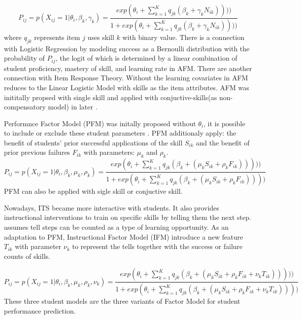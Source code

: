 \documentclass[12pt]{article}
\begin{document}
$$
  P_{ij}= p(X_{ij}=1|\theta_i,\beta_k,\gamma_k)=  \frac{exp(\theta_i+ \sum_{k=1}^{K} q_{jk} (\beta_k+\gamma_k N_{ik}))) )}{1+exp(\theta_i+ \sum_{k=1}^{K} q_{jk} (\beta_k+\gamma_k N_{ik}))) )}
$$ 
 where $q_{jk}$ represents  item $j$ uses skill $k$ with binary value.
 There is a connection with Logistic Regression by modeling success as a Bernoulli distribution with the probability of $P_{ij}$, the logit of which is determined by a linear combination of student proficiency, mastery of skill, and learning rate in AFM.
There are another connection with Item Response Theory. Without the learning covariates in AFM reduces to the Linear Logistic Model with skills as the item attributes. AFM was inititally propsed with single skill and applied with conjuctive-skills(as non-compensatory model) in later \cite{chi2011instructional}.   

 Performnce Factor Model (PFM) was initally proposed without $\theta_i$, it is possible to include or exclude these student parameters \cite{pavlik2009performance}. PFM additionaly apply: the benefit of students' prior successful applications of the skill $S_{ik}$   and the benefit of prior previous failures $F_{ik}$ with parameters: $\mu_k$ and $\rho_k$.
 $$
  P_{ij}= p(X_{ij}=1|\theta_i,\beta_k,\mu_k,\rho_k)=  \frac{exp(\theta_i+ \sum_{k=1}^{K} q_{jk} (\beta_k+(\mu_k S_{ik}+\rho_k F_{ik})))) )}{1+exp(\theta_i+ \sum_{k=1}^{K} q_{jk} (\beta_k+(\mu_k S_{ik}+\rho_k F_{ik}))) )}
$$
PFM can also be applied with sigle skill or conjuctive skill\cite{gong2010comparing,chi2011instructional}. 
 

 Nowadays, ITS became more interactive with students. It also provides instructional interventions to train on specific skills by telling them the next step. \cite{chi2011instructional} assumes tell steps  can be counted as a type of learning opportunity. As an adaptation to PFM, Instructional Factor Model (IFM) introduce a new feature $T_{ik}$ with parameter $\nu_k$  to represent the tells together with the success or failure counts of skills. 
  

$$
  P_{ij}= p(X_{ij}=1|\theta_i,\beta_k,\mu_k,\rho_k,\nu_k)=  \frac{exp(\theta_i+ \sum_{k=1}^{K} q_{jk} (\beta_k+(\mu_k S_{ik}+\rho_k F_{ik}+\nu_k T_{ik})))) )}{1+exp(\theta_i+ \sum_{k=1}^{K} q_{jk} (\beta_k+(\mu_k S_{ik}+\rho_k F_{ik}+\nu_k T_{ik}))) )}
$$  
  These three student models are the three variants of Factor Model for student performance prediction. 
\end{document}
